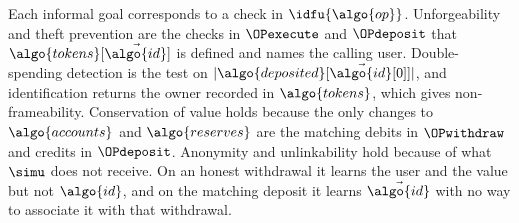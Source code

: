 Each informal goal corresponds to a check in $\idfu{\algo{op}}$. Unforgeability
and theft prevention are the checks in $\OPexecute$ and $\OPdeposit$ that
$\algo{tokens}[\vec{\algo{id}}]$ is defined and names the calling user.
Double-spending detection is the test on
$|\algo{deposited}[\vec{\algo{id}}[0]]|$, and identification returns the owner
recorded in $\algo{tokens}$, which gives non-frameability.
Conservation of value holds because the only changes to $\algo{accounts}$ and
$\algo{reserves}$ are the matching debits in $\OPwithdraw$ and credits in
$\OPdeposit$. Anonymity and unlinkability hold because of what $\simu$ does not
receive. On an honest withdrawal it learns the user and the value but not $\algo{id}$, and
on the matching deposit it learns $\vec{\algo{id}}$ with no way to associate it
with that withdrawal.

